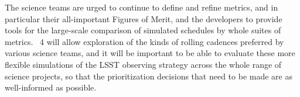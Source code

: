 
The science teams are urged to continue to define and refine metrics, and in particular their all-important Figures of Merit, and the \MAF developers to provide
tools for the large-scale comparison of simulated schedules by whole suites of metrics. \OpSim~4 will allow  exploration of the kinds of rolling cadences preferred by various science teams, and it will be important to be able to evaluate these more flexible simulations of the LSST observing strategy across the whole range of science projects, so that the prioritization decisions that need to be made are as well-informed as possible.


\navigationbar
